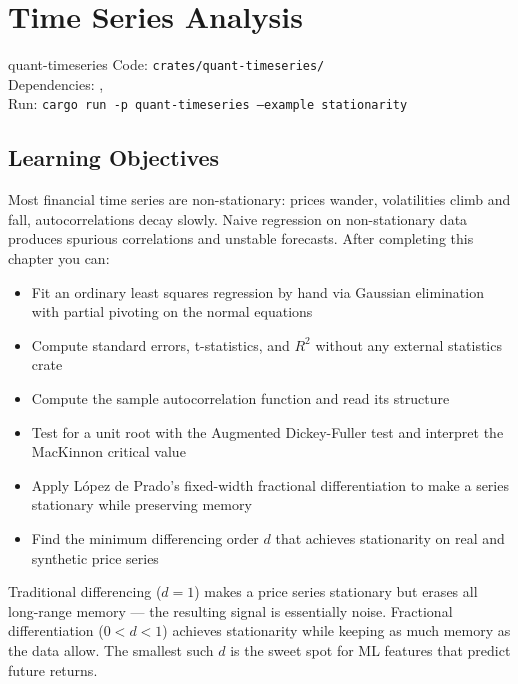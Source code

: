 \chapter{Time Series Analysis}
\label{ch:timeseries}

\begin{companioncode}{quant-timeseries}
Code: \texttt{crates/quant-timeseries/}\\
Dependencies: , \\
Run: \texttt{cargo run -p quant-timeseries --example stationarity}
\end{companioncode}

\section{Learning Objectives}

Most financial time series are non-stationary: prices wander, volatilities
climb and fall, autocorrelations decay slowly. Naive regression on
non-stationary data produces spurious correlations and unstable forecasts.
After completing this chapter you can:

\begin{itemize}
    \item Fit an ordinary least squares regression by hand via Gaussian
      elimination with partial pivoting on the normal equations
    \item Compute standard errors, t-statistics, and $R^2$ without any
      external statistics crate
    \item Compute the sample autocorrelation function and read its structure
    \item Test for a unit root with the Augmented Dickey-Fuller test and
      interpret the MacKinnon critical value
    \item Apply López de Prado's fixed-width fractional differentiation to
      make a series stationary while preserving memory
    \item Find the minimum differencing order $d$ that achieves stationarity
      on real and synthetic price series
\end{itemize}

\begin{keyinsight}
Traditional differencing ($d = 1$) makes a price series stationary but erases
all long-range memory --- the resulting signal is essentially noise. Fractional
differentiation ($0 < d < 1$) achieves stationarity while keeping as much memory
as the data allow. The smallest such $d$ is the sweet spot for ML features that
predict future returns.
\end{keyinsight}


